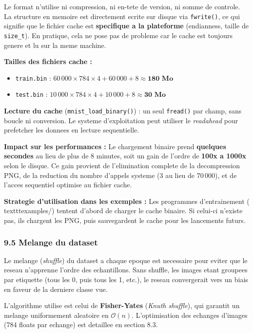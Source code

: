 \documentclass[
  letterpaper,
  DIV=11,
  numbers=noendperiod]{scrartcl}
\providecommand{\tightlist}{%
  \setlength{\itemsep}{0pt}\setlength{\parskip}{0pt}}
\begin{document}
Le format n'utilise ni compression, ni en-tete de version, ni somme de controle. La structure en memoire est directement ecrite sur disque via \texttt{fwrite()}, ce qui signifie que le fichier cache est \textbf{specifique a la plateforme} (endianness, taille de \texttt{size\_t}). En pratique, cela ne pose pas de probleme car le cache est toujours genere et lu sur la meme machine.

\textbf{Tailles des fichiers cache :}
\begin{itemize}
\tightlist
\item \texttt{train.bin} : \(60\,000 \times 784 \times 4 + 60\,000 + 8 \approx \textbf{180 Mo}\)
\item \texttt{test.bin} : \(10\,000 \times 784 \times 4 + 10\,000 + 8 \approx \textbf{30 Mo}\)
\end{itemize}

\textbf{Lecture du cache} (\texttt{mnist\_load\_binary()}) : un seul \texttt{fread()} par champ, sans boucle ni conversion. Le systeme d'exploitation peut utiliser le \emph{readahead} pour prefetcher les donnees en lecture sequentielle.

\textbf{Impact sur les performances :} Le chargement binaire prend \textbf{quelques secondes} au lieu de plus de 8 minutes, soit un gain de l'ordre de \textbf{100x a 1000x} selon le disque. Ce gain provient de l'elimination complete de la decompression PNG, de la reduction du nombre d'appels systeme (3 au lieu de 70\,000), et de l'acces sequentiel optimise au fichier cache.

\textbf{Strategie d'utilisation dans les exemples :} Les programmes d'entrainement (\\texttt{examples/}) tentent d'abord de charger le cache binaire. Si celui-ci n'existe pas, ils chargent les PNG, puis sauvegardent le cache pour les lancements futurs.

\subsubsection{9.5 Melange du dataset}\label{melange-dataset}

Le melange (\emph{shuffle}) du dataset a chaque epoque est necessaire pour eviter que le reseau n'apprenne l'ordre des echantillons. Sans shuffle, les images etant groupees par etiquette (tous les 0, puis tous les 1, etc.), le reseau convergerait vers un biais en faveur de la derniere classe vue.

L'algorithme utilise est celui de \textbf{Fisher-Yates} (\emph{Knuth shuffle}), qui garantit un melange uniformement aleatoire en \(\mathcal{O}(n)\). L'optimisation des echanges d'images (784 floats par echange) est detaillee en section 8.3.
\end{document}
